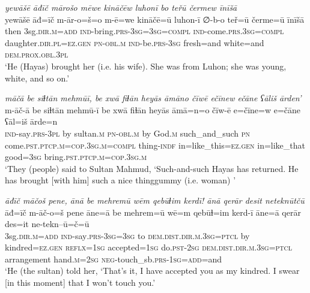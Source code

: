\ea \label{ŽH.65}
\textit{yewāšē āđīč mārošo mēwe kināčēw luhonī bo teřū čermew īnīšā} \\ 
\gll yewāšē āđ=īč m-ār-o=š=o m-ē=we kināčē=ū luhon-ī ∅-b-o teř=ū čerme=ū īnīšā \\ 
 then 3sg\textsc{.dir}\textsc{.m}\textsc{=add} \textsc{ind-}bring\textsc{.prs}\textsc{-3sg}\textsc{=3sg}\textsc{=compl} \textsc{ind-}come\textsc{.prs}\textsc{.3sg}\textsc{=compl} daughter\textsc{.dir}\textsc{.pl}\textsc{=ez}\textsc{.gen} \textsc{pn}\textsc{-obl}\textsc{.m} \textsc{ind-}be\textsc{.prs}\textsc{-3sg} fresh=and white=and \textsc{dem.prox}\textsc{.obl}\textsc{.3pl} \\ 
\glt `He (Hayas) brought her (i.e. his wife). She was from Luhon; she was young, white, and so on.'
\z 
 
\ea \label{ŽH.66}
\textit{māčā be siɫtān mehmūī, be xwā fiɫān heyās āmāno čīwē ečīnew ečāne ʕāliš ārden’} \\ 
\gll m-āč-ā be siɫtān mehmū-ī be xwā fiɫān heyās āmā=n=o čīw-ē e=čīne=w e=čāne ʕāl=iš ārde=n \\ 
 \textsc{ind-}say\textsc{.prs}\textsc{-3pl} by sultan\textsc{.m} \textsc{pn}\textsc{-obl}\textsc{.m} by God\textsc{.m} such\_and\_such \textsc{pn} come\textsc{.pst}\textsc{.ptcp}\textsc{.m}\textsc{=cop}\textsc{.3sg}\textsc{.m}\textsc{=compl} thing\textsc{-indf} in=like\_this\textsc{=ez}\textsc{.gen} in=like\_that good\textsc{=3sg} bring\textsc{.pst}\textsc{.ptcp}\textsc{.m}\textsc{=cop}\textsc{.3sg}\textsc{.m} \\ 
\glt `They (people) said to Sultan Mahmud, ‘Such-and-such Hayas has returned. He has brought [with him] such a nice thinggummy (i.e. woman)  '
\z 
 
\ea \label{ŽH.103}
\textit{āđīč māčoš pene, ānā be mehremū wēm qebūɫim kerdī! ānā qerār desit neteknūtčū} \\ 
\gll āđ=īč m-āč-o=š pene āne=ā be mehrem=ū wē=m qebūɫ=im kerd-ī āne=ā qerār des=it ne-tekn--ū=č=ū \\ 
 3sg\textsc{.dir}\textsc{.m}\textsc{=add} \textsc{ind-}say\textsc{.prs}\textsc{-3sg}\textsc{=3sg} to \textsc{dem.dist}\textsc{.dir}\textsc{.m}\textsc{.3sg}=\textsc{ptcl} by kindred\textsc{=ez}\textsc{.gen} \textsc{reflx}\textsc{=1sg} accepted\textsc{=1sg} do\textsc{.pst}-\textsc{2sg} \textsc{dem.dist}\textsc{.dir}\textsc{.m}\textsc{.3sg}=\textsc{ptcl} arrangement hand\textsc{.m}\textsc{=\textsc{2sg}} \textsc{neg-}touch\_sb\textsc{.prs}\textsc{-1sg}\textsc{=add}=and \\ 
\glt `He (the sultan) told her, ‘That’s it, I have accepted you as my kindred. I swear [in this moment] that I won’t touch you.'
\z 
 
